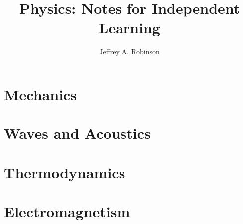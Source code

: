 \documentclass[oneside,draft]{book}
\title{Physics: Notes for Independent Learning}
\author{Jeffrey A. Robinson}
\theoremstyle{definition}
\begin{document}
\frontmatter

\maketitle
\tableofcontents

\mainmatter

\part{Mechanics}















\part{Waves and Acoustics}



\part{Thermodynamics}





\part{Electromagnetism}












\end{document}
